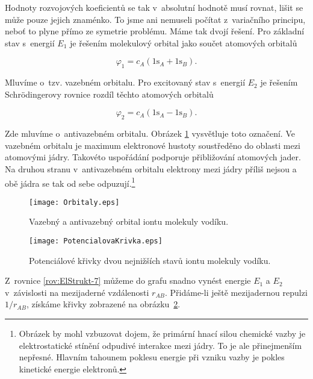 \noindent Hodnoty rozvojových koeficientů se tak v~absolutní hodnotě musí rovnat, lišit se může pouze jejich znaménko. To jsme ani nemuseli počítat z~variačního principu, neboť to plyne přímo ze symetrie problému. Máme tak dvojí řešení. Pro základní stav s~energií $E_1$ je řešením molekulový orbital jako součet atomových orbitalů

\begin{equation}
\varphi_1 = c_A (1\mathrm{s}_A + 1\mathrm{s}_B).
\label{rov:ElStrukt-12}
\end{equation}

\noindent Mluvíme o~tzv. vazebném orbitalu. Pro excitovaný stav s~energií $E_2$ je řešením Schr\"odingerovy rovnice rozdíl těchto atomových orbitalů

\begin{equation}
\varphi_2 = c_A(1\mathrm{s}_A - 1\mathrm{s}_B).
\label{rov:ElStrukt-13}
\end{equation}

\noindent Zde mluvíme o~antivazebném orbitalu. Obrázek \ref{obr:Vodik-orbitaly} vysvětluje toto označení. Ve vazebném orbitalu je maximum elektronové hustoty soustředěno do oblasti mezi atomovými jádry. Takovéto uspořádání podporuje přibližování atomových jader. Na druhou stranu v~antivazebném orbitalu elektrony mezi jádry příliš nejsou a obě jádra se tak od sebe odpuzují.\footnote{Obrázek by mohl vzbuzovat dojem, že primární hnací silou chemické vazby je elektrostatické stínění odpudivé interakce mezi jádry. To je ale přinejmenším nepřesné. Hlavním tahounem poklesu energie při vzniku vazby je pokles kinetické energie elektronů.} 

\begin{figure} [htb]
\centering
\texttt{[image: Orbitaly.eps]}
\caption[Orbitaly iontu vodíku]{Vazebný a antivazebný orbital iontu molekuly vodíku.}
\label{obr:Vodik-orbitaly}
\end{figure}

\begin{figure} [htb]
\centering
\texttt{[image: PotencialovaKrivka.eps]}
\caption[Potenciálové křivky iontu vodíku]{Potenciálové křivky dvou nejnižších stavů iontu molekuly vodíku.}
\label{obr:PotencialovaKrivka}
\end{figure}

\noindent Z~rovnice \eqref{rov:ElStrukt-7} můžeme do grafu snadno vynést energie $E_1$ a $E_2$ v~závislosti na mezijaderné vzdálenosti $r_{AB}$. Přidáme-li ještě mezijadernou repulzi $1/r_{AB}$, získáme křivky zobrazené na obrázku~\ref{obr:PotencialovaKrivka}.

